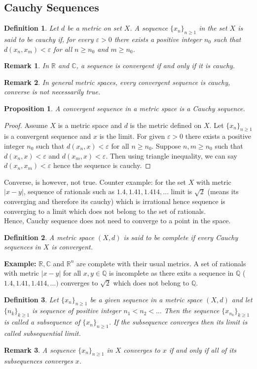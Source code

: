 \documentclass[12pt]{report}
\newtheorem{defn}{Definition}
\newtheorem*{rem}{Remark}
\newtheorem{prop}{Proposition}
\begin{document}
\subsection*{Cauchy Sequences}
\begin{defn}
    Let $d$ be a metric on set $X$. A sequence $\{x_n\}_{n \geq 1}$ in the set $X$ is said to be cauchy if, for every $\varepsilon > 0$ there exists a positive integer $n_0$ such that $d(x_n,x_m)< \varepsilon$ for all $n \geq n_0$ and $m \geq n_0$.
\end{defn}
\begin{rem}
    In $\mathbb{R}$ and $\mathbb{C}$, a sequence is convergent if and only if it is cauchy.
\end{rem}
\begin{rem}
    In general metric spaces, every convergent sequence is cauchy, converse is not necessarily true.
\end{rem}
\begin{prop}
    A convergent sequence in a metric space is a Cauchy sequence.
\end{prop}
\begin{proof}
    Assume $X$ is a metric space and $d$ is the metric defined on $X$. Let $\{x_n\}_{n \geq 1}$ is a convergent sequence and $x$ is the limit. For given $\varepsilon > 0$ there exists a positive integer $n_0$ such that $d(x_n, x) < \varepsilon$ for all $n \geq n_0$. Suppose $n,m \geq n_0$ such that $d(x_n, x) < \varepsilon$ and $d(x_m, x) < \varepsilon$. Then using triangle inequality, we can say $d(x_n, x_m) < \varepsilon$ hence the sequence is cauchy. 
\end{proof}
Converse, is however, not true. Counter example: for the set $X$ with metric $|x - y|$, sequence of rationals such as $1.4, 1.41, 1.414, \dots $ limit is $\sqrt{2}$ (means its converging and therefore its cauchy) which is irrational hence sequence is converging to a limit which does not belong to the set of rationals.\\
Hence, Cauchy sequence does not need to converge to a point in the space.
\begin{defn}
    A metric space $(X,d)$ is said to be complete if every Cauchy sequences in $X$ is convergent.
\end{defn}
\textbf{Example:} $\mathbb{R},\mathbb{C}$ and $\mathbb{R}^n$ are complete with their usual metrics. A set of rationals with metric $|x - y|$ for all $x,y \in \mathbb{Q}$ is incomplete as there exits a sequence in $\mathbb{Q}$ ($1.4, 1.41, 1.414, \dots)$ converges to $\sqrt{2}$ which does not belong to $\mathbb{Q}$.
\begin{defn}
    Let $\{x_n\}_{n\geq 1}$ be a given sequence in a metric space $(X,d)$ and let $\{n_k\}_{k\geq 1}$ is sequence of positive integer $n_1 < n_2 < \dots$ Then the sequence $\{x_{n_k}\}_{k \geq 1}$ is called a subsequence of $\{x_n\}_{n\geq 1}$. If the subsequence converges then its limit is called subsequential limit. 
\end{defn}
\begin{rem}
    A sequence $\{x_n\}_{n\geq 1}$ in $X$ converges to $x$ if and only if all of its subsequences converges      $x$.
\end{rem}
\end{document}

